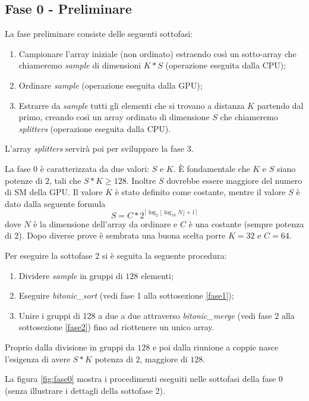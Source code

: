 \documentclass[a4paper, 11pt]{article}
\begin{document}
		\subsection{Fase 0 - Preliminare}
			\label{fase0}
			La fase preliminare consiste delle seguenti sottofasi:
			\begin{enumerate}
				\item Campionare l'array iniziale (non ordinato) estraendo così un sotto-array che chiameremo \emph{sample} di dimensioni $K*S$ 
				(operazione eseguita dalla CPU);
				\item Ordinare \emph{sample} (operazione eseguita dalla GPU);
				\item Estrarre da \emph{sample} tutti gli elementi che si trovano a distanza $K$ partendo dal primo, creando così
					un array ordinato di dimensione $S$ che chiameremo \emph{splitters} (operazione eseguita dalla CPU).
			\end{enumerate} 
			L'array \emph{splitters} servirà poi per sviluppare la fase 3.
			
			La fase 0 è caratterizzata da due valori: $S$ e $K$.
			È fondamentale che $K$ e $S$ siano potenze di $2$, tali che $S*K \geq 128$.
			Inoltre $S$ dovrebbe essere maggiore del numero di SM della GPU.
			Il valore $K$ è stato definito come costante, 
			mentre il valore $S$ è dato dalla seguente formula			
			$$S = C * 2^{\lceil \log_2 \lfloor \log_{10} N \rfloor + 1 \rceil}$$
			dove $N$ è la dimensione dell'array da ordinare e 
			$C$ è una costante (sempre potenza di $2$). 
			Dopo diverse prove è sembrata una buona scelta porre $K = 32$ e $C = 64$.
			
			Per eseguire la sottofase 2 si è seguita la seguente procedura:
			\begin{enumerate}
				\item Dividere \emph{sample} in gruppi di $128$ elementi;
				\item Eseguire \emph{bitonic\_sort} \cite{BS} (vedi fase 1 alla sottosezione \ref{fase1});
				\item Unire i gruppi di 128 a due a due attraverso \emph{bitonic\_merge} \cite{BS} (vedi fase 2 alla sottosezione \ref{fase2}) 
				fino ad riottenere un unico array.
			\end{enumerate}
		
			Proprio dalla divisione in gruppi da $128$ e poi dalla riunione a coppie nasce l'esigenza di avere $S*K$ potenza 
			di $2$, maggiore di $128$.
			
			La figura \ref{fig:fase0} mostra i procedimenti eseguiti nelle sottofasi della fase 0
			(senza illustrare i dettagli della sottofase 2).
			
\end{document}
